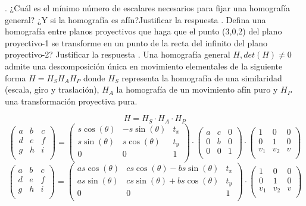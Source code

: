 \documentclass[12pt,a4paper]{article}
\begin{document}
	. ¿Cuál es el mínimo número de escalares necesarios para fijar 
	una homografía general? ¿Y si la homografía es afín?Justificar la respuesta
	. Defina una homografía entre planos proyectivos que haga que el punto (3,0,2) del plano proyectivo-1 se transforme en un punto de la recta del infinito del plano proyectivo-2? Justificar la respuesta
	. Una homografía general $H, det(H)\ne0$ admite una descomposición única en movimiento elementales de la siguiente forma $H=H_SH_AH_P$ donde $H_S$ representa la homografía de una similaridad (escala, giro y traslación), $H_A$ la homografía de un movimiento afín puro y  $H_P$ una transformación proyectiva pura.
	
	$$H = H_S \cdot H_A \cdot H_P$$
	$$
	\begin{pmatrix}
		a & b & c\\
		d & e & f\\
		g & h & i\\
	\end{pmatrix}
	= 
	\begin{pmatrix}
		s\cos(\theta) & -s\sin(\theta) & t_x\\
		s\sin(\theta) & s\cos(\theta) & t_y\\
		0 & 0 & 1\\
	\end{pmatrix}
	\cdot
	\begin{pmatrix}
		a & c & 0 \\
		0 & b & 0 \\
		0 & 0 & 1\\
	\end{pmatrix}
	 \cdot
	 \begin{pmatrix}
		 1 & 0 & 0 \\
		 0 & 1 & 0 \\
		 v_1 & v_2 & v\\
	 \end{pmatrix}
	$$
	$$
	\begin{pmatrix}
	a & b & c\\
	d & e & f\\
	g & h & i\\
	\end{pmatrix}
	= 
	\begin{pmatrix}
	as\cos(\theta) & cs\cos(\theta)-bs\sin(\theta) & t_x\\
	as\sin(\theta) & cs\sin(\theta)+bs\cos(\theta) & t_y\\
	0 & 0 & 1\\
	\end{pmatrix}
	\cdot
	\begin{pmatrix}
	1 & 0 & 0 \\
	0 & 1 & 0 \\
	v_1 & v_2 & v\\
	\end{pmatrix}
	$$
\end{document}
